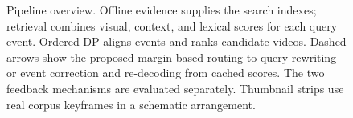 \begin{figure}[t]
\centering
\resizebox{\textwidth}{!}{}
\caption{Pipeline overview. Offline evidence supplies the search indexes; retrieval combines visual, context, and lexical scores for each query event. Ordered DP aligns events and ranks candidate videos. Dashed arrows show the proposed margin-based routing to query rewriting or event correction and re-decoding from cached scores. The two feedback mechanisms are evaluated separately. Thumbnail strips use real corpus keyframes in a schematic arrangement.}
\label{fig:pipeline}
\end{figure}
